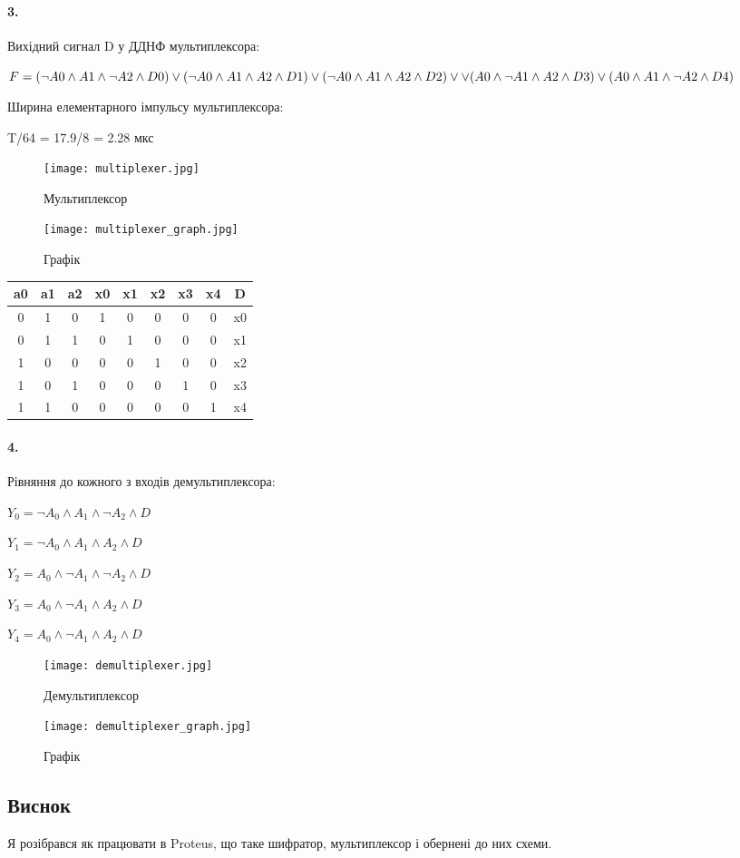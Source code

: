 \documentclass[12pt]{extarticle}
\begin{document}
\vspace{12pt}
\paragraph{3.}
Вихідний сигнал D у ДДНФ мультиплексора:

$F = (\neg A0 \land A1 \land \neg A2 \land D0) \lor
    (\neg A0 \land A1 \land A2 \land D1) \lor
    (\neg A0 \land A1 \land A2 \land D2) \lor \break \lor
    (A0 \land \neg A1 \land A2 \land D3) \lor
    (A0 \land A1 \land \neg A2 \land D4)$

Ширина елементарного імпульсу мультиплексора:

T/64 = 17.9/8 = 2.28 мкс
\begin{figure}[H]
    \centering
    \texttt{[image: multiplexer.jpg]}
    \caption{Мультиплексор}
\end{figure}
\begin{figure}[H]
    \centering
    \texttt{[image: multiplexer\_graph.jpg]}
    \caption{Графік}
\end{figure}
\begin{center}
    \begin{tabular}{| c | c | c | c | c | c | c | c | c |}
    \hline
    a0 & a1 & a2 & x0 & x1 & x2 & x3 & x4 & D \\
    \hline
    0 & 1 & 0 & 1 & 0 & 0 & 0 & 0 & x0\\
    0 & 1 & 1 & 0 & 1 & 0 & 0 & 0 & x1\\
    1 & 0 & 0 & 0 & 0 & 1 & 0 & 0 & x2\\
    1 & 0 & 1 & 0 & 0 & 0 & 1 & 0 & x3\\
    1 & 1 & 0 & 0 & 0 & 0 & 0 & 1 & x4\\
    \hline
    \end{tabular}
\end{center}
\paragraph{4.}
Рівняння до кожного з входів демультиплексора:

$Y_0 = \neg A_0 \land A_1 \land \neg A_2 \land D$

$Y_1 = \neg A_0 \land A_1 \land A_2 \land D$

$Y_2 = A_0 \land \neg A_1 \land \neg A_2 \land D$

$Y_3 = A_0 \land \neg A_1 \land A_2  \land D$

$Y_4 = A_0 \land \neg A_1 \land A_2 \land D$

\begin{figure}[H]
    \centering
    \texttt{[image: demultiplexer.jpg]}
    \caption{Демультиплексор}
\end{figure}
\begin{figure}[H]
    \centering
    \texttt{[image: demultiplexer\_graph.jpg]}
    \caption{Графік}
\end{figure}

\subsection*{Виснок}
Я розібрався як працювати в Proteus, що таке шифратор, мультиплексор і обернені до них схеми.
\end{document}
